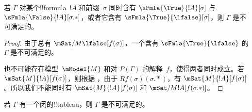 \documentclass[../../../include/open-logic-section]{subfiles}
\begin{document}
\begin{prop}
  若 $\Gamma$ 对某个!!{formula}~$!A$ 和前缀~$\sigma$ 同时含有
  $\sFmla{\True}{!A}[\sigma]$ 与
  $\sFmla{\False}{!A}[\sigma.{*}]$，或者它含有 $\sFmla{\True}{\lfalse}[\sigma]$，则 $\Gamma$ 是不可满足的。
\end{prop}

\begin{proof}
  由于总有 $\mSat/{M}{\lfalse}[f(\sigma)]$，一个含有
  $\sFmla{\True}{\lfalse}$ 的 $\Gamma$ 是不可满足的。

  也不可能存在模型~$\mModel{M}$ 和对
  $P(\Gamma)$ 的解释~$f$，使得两者同时成立。若 $\mSat{M}{!A}[f(\sigma)]$，则根据
  ，由于
  $Rf(\sigma)(\sigma.{*})$，有 $\mSat{M}{!A}[f(\sigma)]$。所以我们不能同时有
  $\mSat{M}{!A}[f(\sigma)]$ 和
  $\mSat/{M}{!A}[f(\sigma.{*})]$。
\end{proof}

\begin{thm}[可靠性]
  若 $\Gamma$ 有一个闭的!!{tableau}，则 $\Gamma$ 是不可满足的。
\end{thm}
\end{document}
